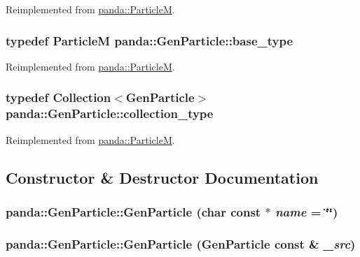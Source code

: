 Reimplemented from \hyperlink{classpanda_1_1ParticleM_a1ba36e35f5cd6a26decfbaa815678d2a}{panda::ParticleM}.\hypertarget{classpanda_1_1GenParticle_ab81b9a915960640d959816ecbf1397ec}{
\subsubsection[{base\_\-type}]{\setlength{\rightskip}{0pt plus 5cm}typedef {\bf ParticleM} {\bf panda::GenParticle::base\_\-type}}}
\label{classpanda_1_1GenParticle_ab81b9a915960640d959816ecbf1397ec}


Reimplemented from \hyperlink{classpanda_1_1ParticleM_a134d640b78531bc47ddb19ba490de07d}{panda::ParticleM}.\hypertarget{classpanda_1_1GenParticle_a2f1d232f5f5660f0c147145d280df831}{
\subsubsection[{collection\_\-type}]{\setlength{\rightskip}{0pt plus 5cm}typedef {\bf Collection}$<${\bf GenParticle}$>$ {\bf panda::GenParticle::collection\_\-type}}}
\label{classpanda_1_1GenParticle_a2f1d232f5f5660f0c147145d280df831}


Reimplemented from \hyperlink{classpanda_1_1ParticleM_ae39fbe234c21960d067e8790541d0d68}{panda::ParticleM}.

\subsection{Constructor \& Destructor Documentation}
\hypertarget{classpanda_1_1GenParticle_afdb6107d252b4155279305eed77e92f7}{
\subsubsection[{GenParticle}]{\setlength{\rightskip}{0pt plus 5cm}panda::GenParticle::GenParticle (char const $\ast$ {\em name} = {\ttfamily \char`\"{}\char`\"{}})}}
\label{classpanda_1_1GenParticle_afdb6107d252b4155279305eed77e92f7}
\hypertarget{classpanda_1_1GenParticle_aec80c4367bfe4e6113e0a615bc4aa570}{
\subsubsection[{GenParticle}]{\setlength{\rightskip}{0pt plus 5cm}panda::GenParticle::GenParticle ({\bf GenParticle} const \& {\em \_\-src})}}
\label{classpanda_1_1GenParticle_aec80c4367bfe4e6113e0a615bc4aa570}


